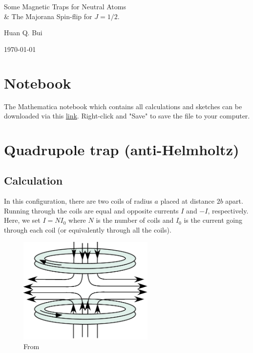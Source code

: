 \documentclass{article}
\theoremstyle{definition}
\begin{document}
	

\begin{center}
	\Large{Some Magnetic Traps for Neutral Atoms \\
	\& The Majorana Spin-flip for $J=1/2$.}
\end{center}	
	
\begin{center}
	\large{Huan Q. Bui}
\end{center}

\begin{center}
	\today
\end{center}



\section{Notebook}
The Mathematica notebook which contains all calculations and sketches can be downloaded via this \href{https://raw.githubusercontent.com/huanium/huanium/master/MIT PhD/BUI_AtomicPhysics/mathematica/magnetic-traps.nb}{link}. Right-click and "Save" to save the file to your computer. 

\section{Quadrupole trap (anti-Helmholtz)}



\subsection{Calculation}


In this configuration, there are two coils of radius $a$ placed at distance $2b$ apart. Running through the coils are equal and opposite currents $I$ and $-I$, respectively. Here, we set $I = NI_0$ where $N$ is the number of coils and $I_0$ is the current going through each coil (or equivalently through all the coils).

\begin{figure}[!htb]
	\centering
	\includegraphics[width=0.6\textwidth]{antiHelmholtz.png}
	\caption{From \cite{maruyama2003optical}}
\end{figure}
\end{document}
